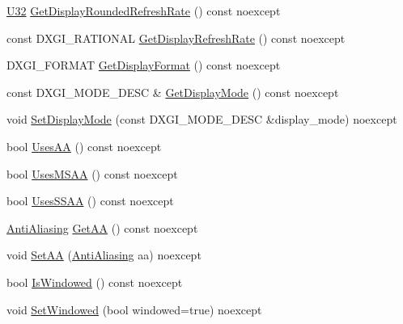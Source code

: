 \begin{DoxyCompactItemize}
\mbox{\hyperlink{namespacemage_a41c104c036fba3756a74e19f793eeaa1}{U32}} \mbox{\hyperlink{classmage_1_1rendering_1_1_display_configuration_a6650e981bf82c85d5339afbc37cee64a}{Get\+Display\+Rounded\+Refresh\+Rate}} () const noexcept
\item 
const D\+X\+G\+I\+\_\+\+R\+A\+T\+I\+O\+N\+AL \mbox{\hyperlink{classmage_1_1rendering_1_1_display_configuration_ae100fc84cd1900e302fb784f429a06b7}{Get\+Display\+Refresh\+Rate}} () const noexcept
\item 
D\+X\+G\+I\+\_\+\+F\+O\+R\+M\+AT \mbox{\hyperlink{classmage_1_1rendering_1_1_display_configuration_a66c6757aa4c17227ab0e7022228f982a}{Get\+Display\+Format}} () const noexcept
\item 
const D\+X\+G\+I\+\_\+\+M\+O\+D\+E\+\_\+\+D\+E\+SC \& \mbox{\hyperlink{classmage_1_1rendering_1_1_display_configuration_af3cd8d29b8f6d6bc0fa1579260badf99}{Get\+Display\+Mode}} () const noexcept
\item 
void \mbox{\hyperlink{classmage_1_1rendering_1_1_display_configuration_a7cc6b9dcf3932a62bfd1416fc7b397ea}{Set\+Display\+Mode}} (const D\+X\+G\+I\+\_\+\+M\+O\+D\+E\+\_\+\+D\+E\+SC \&display\+\_\+mode) noexcept
\item 
bool \mbox{\hyperlink{classmage_1_1rendering_1_1_display_configuration_abbcb68e66c4a659cb169819a4f1d0d5d}{Uses\+AA}} () const noexcept
\item 
bool \mbox{\hyperlink{classmage_1_1rendering_1_1_display_configuration_a1cd8c25ade06ad47945ca0046e350749}{Uses\+M\+S\+AA}} () const noexcept
\item 
bool \mbox{\hyperlink{classmage_1_1rendering_1_1_display_configuration_ad233d7838a302fa0ce73cf06b1660404}{Uses\+S\+S\+AA}} () const noexcept
\item 
\mbox{\hyperlink{namespacemage_1_1rendering_ac3f75e49e92b42f2f5fb55c450d8899c}{Anti\+Aliasing}} \mbox{\hyperlink{classmage_1_1rendering_1_1_display_configuration_a243b2a170b97a9583f76a8f16aee5ba6}{Get\+AA}} () const noexcept
\item 
void \mbox{\hyperlink{classmage_1_1rendering_1_1_display_configuration_a8cb3173220d7405353fa4d1726e7063d}{Set\+AA}} (\mbox{\hyperlink{namespacemage_1_1rendering_ac3f75e49e92b42f2f5fb55c450d8899c}{Anti\+Aliasing}} aa) noexcept
\item 
bool \mbox{\hyperlink{classmage_1_1rendering_1_1_display_configuration_acbe793e625311707e234fcd0977978d5}{Is\+Windowed}} () const noexcept
\item 
void \mbox{\hyperlink{classmage_1_1rendering_1_1_display_configuration_a78d0902979bd5a0eff7fef0aa7976a7f}{Set\+Windowed}} (bool windowed=true) noexcept

\end{DoxyCompactItemize}
